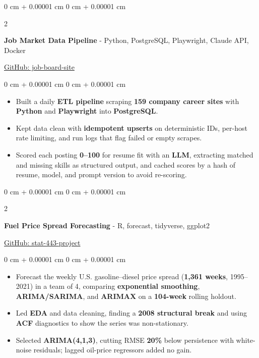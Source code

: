 \documentclass[9pt, letterpaper]{extarticle}
\newenvironment{highlights}{
    \begin{itemize}[
        topsep=0.10 cm,
        parsep=0.10 cm,
        partopsep=0pt,
        itemsep=0pt,
        leftmargin=0 cm + 10pt
    ]
}{
    \end{itemize}
} %
\newenvironment{onecolentry}{
    \begin{adjustwidth}{
        0 cm + 0.00001 cm
    }{
        0 cm + 0.00001 cm
    }
}{
    \end{adjustwidth}
} %
\newenvironment{twocolentry}[2][]{
    \onecolentry
    \def\secondColumn{#2}
    \setcolumnwidth{\fill, 4.5 cm}
    \begin{paracol}{2}
}{
    \switchcolumn \raggedleft \secondColumn
    \end{paracol}
    \endonecolentry
} %
\begin{document}
        \begin{twocolentry}
        {\href{https://github.com/ayushtvora/job-board-site}{GitHub: job-board-site}}
            \textbf{Job Market Data Pipeline} - Python, PostgreSQL, Playwright, Claude API, Docker
        \end{twocolentry}
        \vspace{0.10 cm}
        \begin{onecolentry}
            \begin{highlights}
                \item Built a daily \textbf{ETL pipeline} scraping \textbf{159 company career sites} with \textbf{Python} and \textbf{Playwright} into \textbf{PostgreSQL}.
                \item Kept data clean with \textbf{idempotent upserts} on deterministic IDs, per-host rate limiting, and run logs that flag failed or empty scrapes.
                \item Scored each posting \textbf{0--100} for resume fit with an \textbf{LLM}, extracting matched and missing skills as structured output, and cached scores by a hash of resume, model, and prompt version to avoid re-scoring.
            \end{highlights}
        \end{onecolentry}

        \vspace{0.2 cm}

        \begin{twocolentry}
        {\href{https://github.com/ayushtvora/stat-443-project}{GitHub: stat-443-project}}
            \textbf{Fuel Price Spread Forecasting} - R, forecast, tidyverse, ggplot2
        \end{twocolentry}
        \vspace{0.10 cm}
        \begin{onecolentry}
            \begin{highlights}
                \item Forecast the weekly U.S. gasoline--diesel price spread (\textbf{1,361 weeks}, 1995--2021) in a team of 4, comparing \textbf{exponential smoothing}, \textbf{ARIMA/SARIMA}, and \textbf{ARIMAX} on a \textbf{104-week} rolling holdout.
                \item Led \textbf{EDA} and data cleaning, finding a \textbf{2008 structural break} and using \textbf{ACF} diagnostics to show the series was non-stationary.
                \item Selected \textbf{ARIMA(4,1,3)}, cutting RMSE \textbf{20\%} below persistence with white-noise residuals; lagged oil-price regressors added no gain.
            \end{highlights}
        \end{onecolentry}
\end{document}
